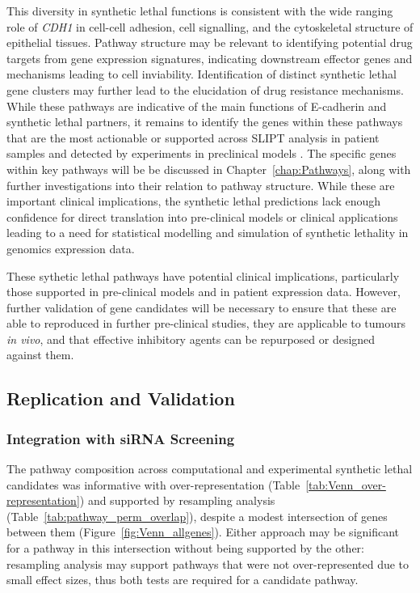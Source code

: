 This diversity in synthetic lethal functions is consistent with the wide ranging role of \textit{CDH1} in cell-cell adhesion, cell signalling, and the cytoskeletal structure of epithelial tissues. Pathway structure may be relevant to identifying potential drug targets from gene expression signatures, indicating downstream effector genes and mechanisms leading to cell inviability. Identification of distinct synthetic lethal gene clusters may further lead to the elucidation of drug resistance mechanisms. While these pathways are indicative of the main functions of E-cadherin and synthetic lethal partners, it remains to identify the genes within these pathways that are the most actionable or supported across \gls{SLIPT} analysis in patient samples and detected by experiments in preclinical models \citep{Chen2014, Telford2015}.  The specific genes within key pathways will be be discussed in Chapter~\ref{chap:Pathways}, along with further investigations into their relation to pathway structure.  While these are important clinical implications, the synthetic lethal predictions lack enough confidence for direct translation into pre-clinical models or clinical applications leading to a need for statistical modelling and simulation of synthetic lethality in genomics expression data.

These sythetic lethal pathways have potential clinical implications, particularly those supported in pre-clinical models and in patient expression data. However, further validation of gene candidates will be necessary to ensure that these are able to reproduced in further pre-clinical studies, they are applicable to tumours \textit{in vivo}, and that effective inhibitory agents can be repurposed or designed against them.

\subsection{Replication and Validation}

\subsubsection{Integration with siRNA Screening}

The pathway composition across computational and experimental synthetic lethal candidates was informative with over-represent\-ation (Table~\ref{tab:Venn_over-representation}) and supported by resampling analysis (Table~\ref{tab:pathway_perm_overlap}), despite a modest intersection of genes between them (Figure~\ref{fig:Venn_allgenes}). Either approach may be significant for a pathway in this intersection without being supported by the other: resampling analysis may support pathways that were not over-represent\-ed due to small effect sizes, thus both tests are required for a candidate pathway.

